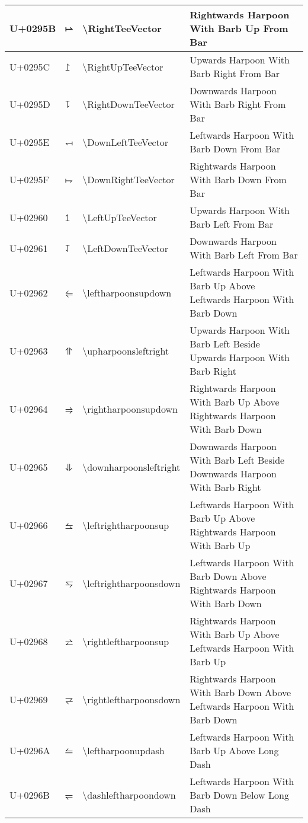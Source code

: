 \begin{table}[h]
\begin{tabulary}{\linewidth}{|L|L|L|L|}
\hline
U+0295B & ⥛ & {\textbackslash}RightTeeVector & Rightwards Harpoon With Barb Up From Bar \\
\hline
U+0295C & ⥜ & {\textbackslash}RightUpTeeVector & Upwards Harpoon With Barb Right From Bar \\
\hline
U+0295D & ⥝ & {\textbackslash}RightDownTeeVector & Downwards Harpoon With Barb Right From Bar \\
\hline
U+0295E & ⥞ & {\textbackslash}DownLeftTeeVector & Leftwards Harpoon With Barb Down From Bar \\
\hline
U+0295F & ⥟ & {\textbackslash}DownRightTeeVector & Rightwards Harpoon With Barb Down From Bar \\
\hline
U+02960 & ⥠ & {\textbackslash}LeftUpTeeVector & Upwards Harpoon With Barb Left From Bar \\
\hline
U+02961 & ⥡ & {\textbackslash}LeftDownTeeVector & Downwards Harpoon With Barb Left From Bar \\
\hline
U+02962 & ⥢ & {\textbackslash}leftharpoonsupdown & Leftwards Harpoon With Barb Up Above Leftwards Harpoon With Barb Down \\
\hline
U+02963 & ⥣ & {\textbackslash}upharpoonsleftright & Upwards Harpoon With Barb Left Beside Upwards Harpoon With Barb Right \\
\hline
U+02964 & ⥤ & {\textbackslash}rightharpoonsupdown & Rightwards Harpoon With Barb Up Above Rightwards Harpoon With Barb Down \\
\hline
U+02965 & ⥥ & {\textbackslash}downharpoonsleftright & Downwards Harpoon With Barb Left Beside Downwards Harpoon With Barb Right \\
\hline
U+02966 & ⥦ & {\textbackslash}leftrightharpoonsup & Leftwards Harpoon With Barb Up Above Rightwards Harpoon With Barb Up \\
\hline
U+02967 & ⥧ & {\textbackslash}leftrightharpoonsdown & Leftwards Harpoon With Barb Down Above Rightwards Harpoon With Barb Down \\
\hline
U+02968 & ⥨ & {\textbackslash}rightleftharpoonsup & Rightwards Harpoon With Barb Up Above Leftwards Harpoon With Barb Up \\
\hline
U+02969 & ⥩ & {\textbackslash}rightleftharpoonsdown & Rightwards Harpoon With Barb Down Above Leftwards Harpoon With Barb Down \\
\hline
U+0296A & ⥪ & {\textbackslash}leftharpoonupdash & Leftwards Harpoon With Barb Up Above Long Dash \\
\hline
U+0296B & ⥫ & {\textbackslash}dashleftharpoondown & Leftwards Harpoon With Barb Down Below Long Dash \\

\end{tabulary}
\end{table}
